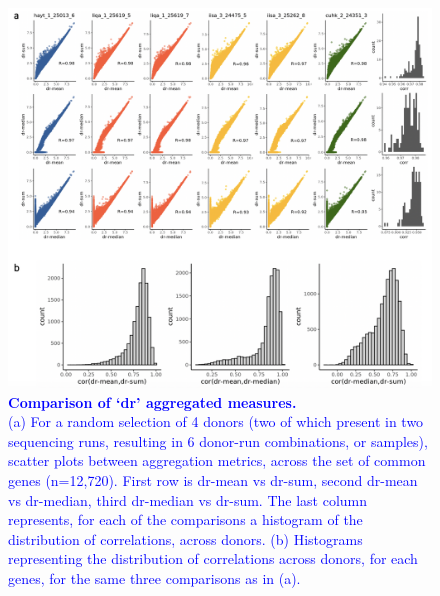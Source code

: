 \begin{figure}[h]
    \centering
    \includegraphics[width=15cm]{Appendix2/Fig/supp_aggregated_figures_dr.png}
    \caption[Comparison of `dr' aggregated measures]{\textcolor{blue}{\textbf{Comparison of `dr' aggregated measures.}\\
    (a) For a random selection of 4 donors (two of which present in two sequencing runs, resulting in 6 donor-run combinations, or samples), scatter plots between aggregation metrics, across the set of common genes (n=12,720).
    First row is dr-mean vs dr-sum, second dr-mean vs dr-median, third dr-median vs dr-sum.
    The last column represents, for each of the comparisons a histogram of the distribution of correlations, across donors.
    (b) Histograms representing the distribution of correlations across donors, for each genes, for the same three comparisons as in (a).}}
    \label{suppl_fig:aggregation_comparison_dr}
\end{figure}

